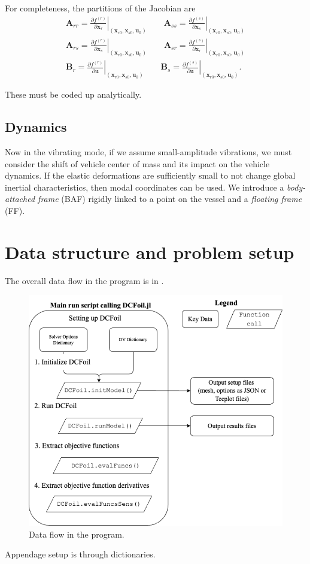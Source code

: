 \documentclass[10pt]{article}
\newcommand{\pp}[2]{\frac{\partial #1}{\partial #2}}
\newcommand{\mbf}[1]{\mathbf{#1}}
\newcommand{\beq}{\begin{equation}
    \begin{aligned}
        }
\newcommand{\eeq}{\end{aligned}
\end{equation}
}
\begin{document}
For completeness, the partitions of the Jacobian are
\beq
\mbf{A}_{rr} = \left. \pp{f^{(r)}}{\mbf{x}_r} \right|_{(\mbf{x}_{r0}, \mbf{x}_{s0}, \mbf{u}_0)}
\qquad
\mbf{A}_{ss} = \left. \pp{f^{(s)}}{\mbf{x}_s} \right|_{(\mbf{x}_{r0}, \mbf{x}_{s0}, \mbf{u}_0)}
\\
\mbf{A}_{rs} = \left. \pp{f^{(r)}}{\mbf{x}_s} \right|_{(\mbf{x}_{r0}, \mbf{x}_{s0}, \mbf{u}_0)}
\qquad
\mbf{A}_{sr} = \left. \pp{f^{(s)}}{\mbf{x}_r} \right|_{(\mbf{x}_{r0}, \mbf{x}_{s0}, \mbf{u}_0)}
\\
\mbf{B}_{r} = \left. \pp{f^{(r)}}{\mbf{u}} \right|_{(\mbf{x}_{r0}, \mbf{x}_{s0}, \mbf{u}_0)}
\qquad
\mbf{B}_{s} = \left. \pp{f^{(s)}}{\mbf{u}} \right|_{(\mbf{x}_{r0}, \mbf{x}_{s0}, \mbf{u}_0)}.
\eeq
These must be coded up analytically.

\subsection{Dynamics}
Now in the vibrating mode, if we assume small-amplitude vibrations, we must consider the shift of vehicle center of mass and its impact on the vehicle dynamics.
If the elastic deformations are sufficiently small to not change global inertial characteristics, then modal coordinates can be used.
We introduce a \emph{body-attached frame} (BAF) rigidly linked to a point on the vessel and a \emph{floating frame} (FF).

\section{Data structure and problem setup}

The overall data flow in the program is in .
\begin{figure}[htb!]
    \centering
    \includegraphics[width=\linewidth,clip,trim={0cm 0cm 0cm 0cm}]{dataFlow.png}
    \caption{\label{fig:DataFlow}Data flow in the program.}
\end{figure}
Appendage setup is through dictionaries.
\end{document}
